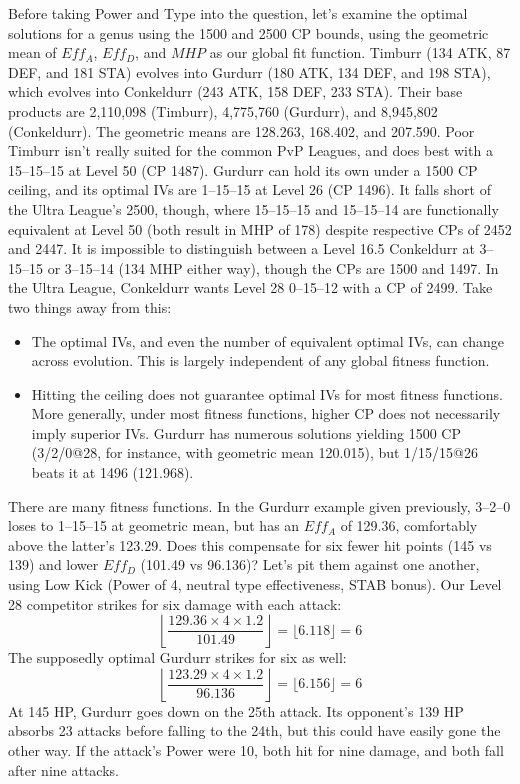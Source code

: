 Before taking Power and Type into the question, let's examine the optimal
 solutions for a genus using the 1500 and 2500 CP bounds, using the
 geometric mean of $Eff_A$, $Eff_D$, and $MHP$ as our global fit function.
Timburr (134 ATK, 87 DEF, and 181 STA) evolves into
  Gurdurr (180 ATK, 134 DEF, and 198 STA), which evolves into
  Conkeldurr (243 ATK, 158 DEF, 233 STA).
Their base products are 2,110,098 (Timburr), 4,775,760 (Gurdurr),
  and 8,945,802 (Conkeldurr).
The geometric means are 128.263, 168.402, and 207.590.
Poor Timburr isn't really suited for the common PvP Leagues,
  and does best with a 15--15--15 at Level 50 (CP 1487).
Gurdurr can hold its own under a 1500 CP ceiling, and its
  optimal IVs are 1--15--15 at Level 26 (CP 1496).
It falls short of the Ultra League's 2500, though, where
  15--15--15 and 15--15--14 are functionally equivalent
  at Level 50 (both result in MHP of 178) despite
  respective CPs of 2452 and 2447.
It is impossible to distinguish between a Level 16.5 Conkeldurr at
  3--15--15 or 3--15--14 (134 MHP either way), though
  the CPs are 1500 and 1497.
In the Ultra League, Conkeldurr wants Level 28 0--15--12 with
  a CP of 2499.
Take two things away from this:
\begin{itemize}
\item The optimal IVs, and even the number of equivalent optimal IVs, can change across evolution.
  This is largely independent of any global fitness function.
\item Hitting the ceiling does not guarantee optimal IVs for most fitness functions.
  More generally, under most fitness functions, higher CP does not necessarily imply superior IVs.
    Gurdurr has numerous solutions yielding 1500 CP (3/2/0@28, for instance, with geometric
    mean 120.015), but 1/15/15@26 beats it at 1496 (121.968).
\end{itemize}
There are many fitness functions. In the Gurdurr example given previously, 3--2--0 loses
    to 1--15--15 at geometric mean, but has an $Eff_A$ of 129.36, comfortably above the latter's 123.29.
 Does this compensate for six fewer hit points (145 vs 139) and lower $Eff_D$ (101.49 vs 96.136)?
 Let's pit them against one another, using Low Kick (Power of 4, neutral type effectiveness, STAB bonus).
 Our Level 28 competitor strikes for six damage with each attack:
    \[ \left\lfloor \frac{129.36 \times 4 \times 1.2}{101.49} \right\rfloor = \lfloor 6.118 \rfloor = 6 \]
 The supposedly optimal Gurdurr strikes for six as well:
    \[ \left\lfloor \frac{123.29 \times 4 \times 1.2}{96.136} \right\rfloor = \lfloor 6.156 \rfloor = 6 \]
 At 145 HP, Gurdurr goes down on the 25th attack.
 Its opponent's 139 HP absorbs 23 attacks before falling to the 24th, but this could
    have easily gone the other way.
 If the attack's Power were 10, both hit for nine damage, and both fall after nine attacks.

